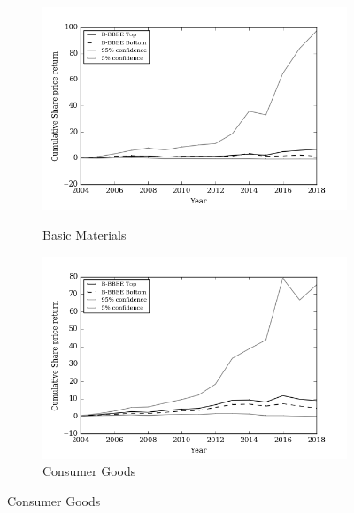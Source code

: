\begin{figure}[!h]
    \begin{subfigure}{\textwidth}
      \centering
      \includegraphics[width=.8\linewidth]{"Images/Bootstrap_Basic Materials_Cumulative"}
      {\small {\it \caption{Basic Materials}}}
    \end{subfigure}
    \begin{subfigure}{\textwidth}
      \centering
      \includegraphics[width=.8\linewidth]{"Images/Bootstrap_Consumer Goods_Cumulative"}
      {\small {\caption{Consumer Goods }}}
    \end{subfigure}
\end{figure}

